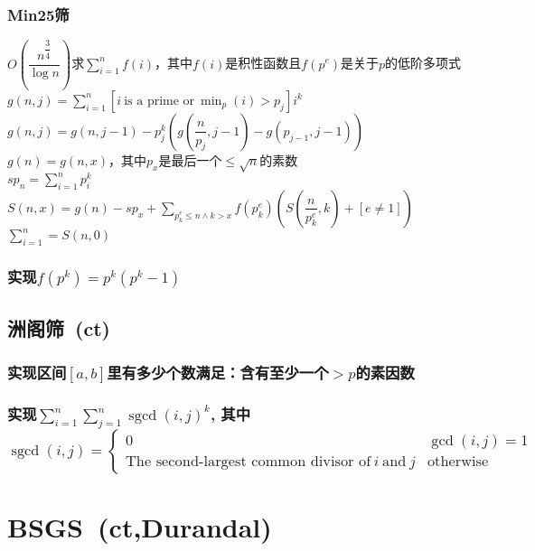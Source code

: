         \subsubsection*{Min25筛}
            $O(\dfrac{n^\dfrac{3}{4}}{\log n})$求$\sum\limits_{i = 1}^n f(i)$，其中$f(i)$是积性函数且$f(p^e)$是关于$p$的低阶多项式
            \\$g(n, j) = \sum\limits_{i = 1}^n [i~\text{is a prime or}~\min_p(i) > p_j] i^k$
            \\$g(n, j) = g(n, j - 1) - p_j^k\left( g\left( \dfrac{n}{p_j}, j - 1 \right) - g\left( p_{j - 1}, j - 1 \right) \right)$
            \\$g(n) = g(n, x)$，其中$p_x$是最后一个$\le \sqrt n$的素数
            \\$sp_n = \sum\limits_{i = 1}^n p_i^k$
            \\$S(n, x) = g(n) - sp_x + \sum\limits_{p_k^e \le n \wedge k > x} f(p_k^e) \left( S\left( \dfrac{n}{p_k^e}, k \right) + [e \ne 1] \right) $
            \\$\sum\limits_{i = 1}^n = S(n, 0)$
        \subsubsection*{实现$f(p^k) = p^k(p^k - 1)$}

    \subsection*{洲阁筛~\small(ct)}
        \subsubsection*{实现区间$[a, b]$里有多少个数满足：含有至少一个$>p$的素因数}
        \subsubsection*{实现$\sum\limits_{i=1}^n \sum\limits_{j=1}^n \operatorname{sgcd}(i, j)^k$, 其中$\operatorname{sgcd}(i, j) = \begin{cases} 0 & \gcd(i, j) = 1 \\ \text{The second-largest common divisor of}~i~\text{and}~j & \text{otherwise} \end{cases}$}

\section{BSGS~\small(ct,Durandal)}
